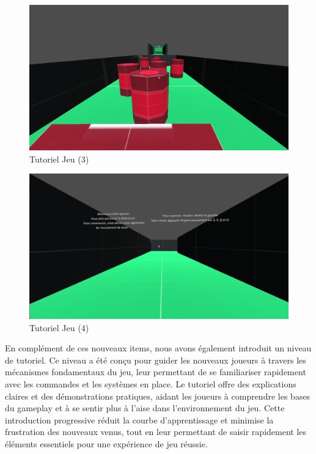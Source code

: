 \documentclass[
	article,			%
	11pt,				%
	oneside,			%
	a4paper,			%
	chapter=TITLE,
	french,			%
	sumario=tradicional
	]{base_nt}
\begin{document}
\begin{figure}[ht]
	\caption{Tutoriel Jeu (3)}
	\centering
	\includegraphics[width=1\linewidth]{paper25.png}
	\legend{}
	
\end{figure}

\newpage

\begin{figure}[ht]
	\caption{Tutoriel Jeu (4)}
	\centering
	\includegraphics[width=1\linewidth]{paper26.png}
	\legend{}
	
\end{figure}

En complément de ces nouveaux items, nous avons également introduit un niveau de tutoriel. Ce niveau a été conçu pour guider les nouveaux joueurs à travers les mécanismes fondamentaux du jeu, leur permettant de se familiariser rapidement avec les commandes et les systèmes en place. Le tutoriel offre des explications claires et des démonstrations pratiques, aidant les joueurs à comprendre les bases du gameplay et à se sentir plus à l'aise dans l'environnement du jeu. Cette introduction progressive réduit la courbe d'apprentissage et minimise la frustration des nouveaux venus, tout en leur permettant de saisir rapidement les éléments essentiels pour une expérience de jeu réussie.
\end{document}
